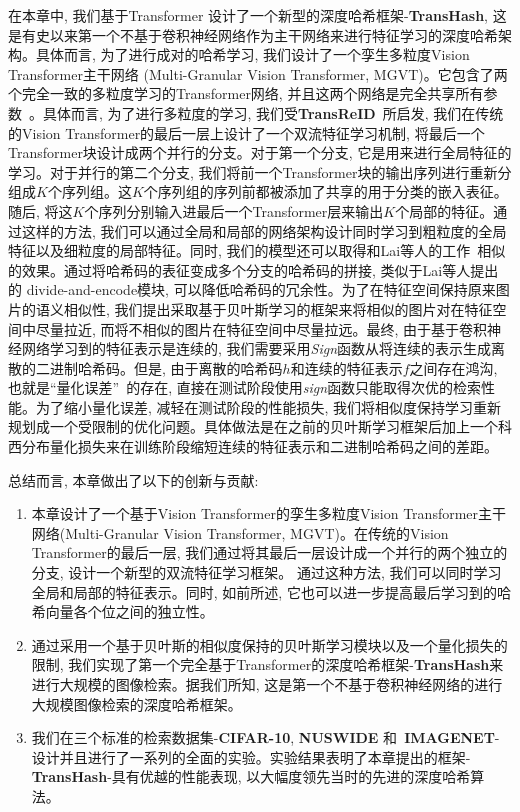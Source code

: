 在本章中, 我们基于Transformer 设计了一个新型的深度哈希框架-\textbf{TransHash}, 这是有史以来第一个不基于卷积神经网络作为主干网络来进行特征学习的深度哈希架构。具体而言, 为了进行成对的哈希学习, 我们设计了一个孪生多粒度Vision Transformer主干网络 (Multi-Granular Vision Transformer, MGVT)。它包含了两个完全一致的多粒度学习的Transformer网络, 并且这两个网络是完全共享所有参数~\cite{bromley1993signature}。具体而言, 为了进行多粒度的学习, 我们受\textbf{TransReID}~\cite{he2021transreid}所启发, 我们在传统的Vision Transformer的最后一层上设计了一个双流特征学习机制, 将最后一个Transformer块设计成两个并行的分支。对于第一个分支, 它是用来进行全局特征的学习。对于并行的第二个分支, 我们将前一个Transformer块的输出序列进行重新分组成$K$个序列组。这$K$个序列组的序列前都被添加了共享的用于分类的嵌入表征。随后, 将这$K$个序列分别输入进最后一个Transformer层来输出$K$个局部的特征。通过这样的方法, 我们可以通过全局和局部的网络架构设计同时学习到粗粒度的全局特征以及细粒度的局部特征。同时, 我们的模型还可以取得和Lai等人的工作~\cite{lai2015simultaneous}相似的效果。通过将哈希码的表征变成多个分支的哈希码的拼接, 类似于Lai等人提出的 divide-and-encode模块, 可以降低哈希码的冗余性。为了在特征空间保持原来图片的语义相似性, 我们提出采取基于贝叶斯学习的框架来将相似的图片对在特征空间中尽量拉近, 而将不相似的图片在特征空间中尽量拉远。最终, 由于基于卷积神经网络学习到的特征表示是连续的, 我们需要采用\textit{Sign}函数从将连续的表示生成离散的二进制哈希码。但是, 由于离散的哈希码$h$和连续的特征表示$f$之间存在鸿沟, 也就是``量化误差''~\cite{zhu2016deep}的存在, 直接在测试阶段使用\textit{sign}函数只能取得次优的检索性能。为了缩小量化误差, 减轻在测试阶段的性能损失, 我们将相似度保持学习重新规划成一个受限制的优化问题。具体做法是在之前的贝叶斯学习框架后加上一个科西分布量化损失来在训练阶段缩短连续的特征表示和二进制哈希码之间的差距。\par
总结而言, 本章做出了以下的创新与贡献:
\begin{enumerate}
    \item 本章设计了一个基于Vision Transformer的孪生多粒度Vision Transformer主干网络(Multi-Granular Vision Transformer, MGVT)。在传统的Vision Transformer的最后一层, 我们通过将其最后一层设计成一个并行的两个独立的分支, 设计一个新型的双流特征学习框架。 通过这种方法, 我们可以同时学习全局和局部的特征表示。同时, 如前所述, 它也可以进一步提高最后学习到的哈希向量各个位之间的独立性。
    \item 通过采用一个基于贝叶斯的相似度保持的贝叶斯学习模块以及一个量化损失的限制, 我们实现了第一个完全基于Transformer的深度哈希框架-\textbf{TransHash}来进行大规模的图像检索。据我们所知, 这是第一个不基于卷积神经网络的进行大规模图像检索的深度哈希框架。
    \item 我们在三个标准的检索数据集-\textbf{CIFAR-10}, \textbf{NUSWIDE} 和~\textbf{IMAGENET}-设计并且进行了一系列的全面的实验。实验结果表明了本章提出的框架-\textbf{TransHash}-具有优越的性能表现, 以大幅度领先当时的先进的深度哈希算法。
\end{enumerate}


